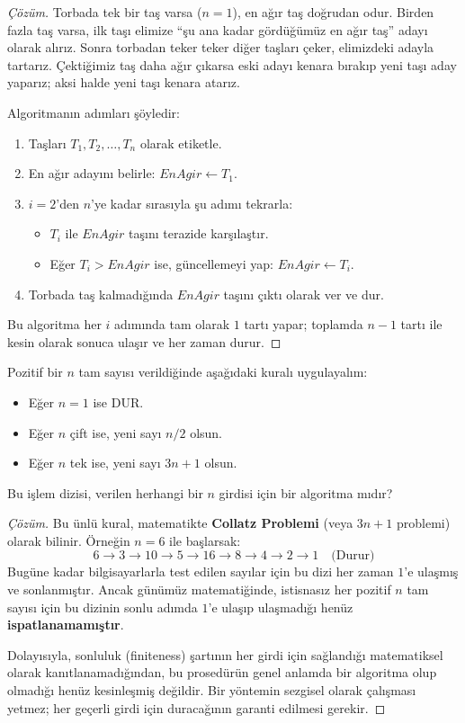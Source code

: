 \begin{proof}[Çözüm]
Torbada tek bir taş varsa ($n=1$), en ağır taş doğrudan odur. Birden fazla taş varsa, ilk taşı elimize ``şu ana kadar gördüğümüz en ağır taş'' adayı olarak alırız. Sonra torbadan teker teker diğer taşları çeker, elimizdeki adayla tartarız. Çektiğimiz taş daha ağır çıkarsa eski adayı kenara bırakıp yeni taşı aday yaparız; aksi halde yeni taşı kenara atarız.

Algoritmanın adımları şöyledir:
\begin{enumerate}
    \item Taşları $T_1, T_2, \dots, T_n$ olarak etiketle.
    \item En ağır adayını belirle: $EnAgir \leftarrow T_1$.
    \item $i = 2$'den $n$'ye kadar sırasıyla şu adımı tekrarla:
    \begin{itemize}
        \item $T_i$ ile $EnAgir$ taşını terazide karşılaştır.
        \item Eğer $T_i > EnAgir$ ise, güncellemeyi yap: $EnAgir \leftarrow T_i$.
    \end{itemize}
    \item Torbada taş kalmadığında $EnAgir$ taşını çıktı olarak ver ve dur.
\end{enumerate}
Bu algoritma her $i$ adımında tam olarak $1$ tartı yapar; toplamda $n - 1$ tartı ile kesin olarak sonuca ulaşır ve her zaman durur.
\end{proof}

\begin{example}
Pozitif bir $n$ tam sayısı verildiğinde aşağıdaki kuralı uygulayalım:
\begin{itemize}
    \item Eğer $n = 1$ ise DUR.
    \item Eğer $n$ çift ise, yeni sayı $n / 2$ olsun.
    \item Eğer $n$ tek ise, yeni sayı $3n + 1$ olsun.
\end{itemize}
Bu işlem dizisi, verilen herhangi bir $n$ girdisi için bir algoritma mıdır?
\end{example}

\begin{proof}[Çözüm]
Bu ünlü kural, matematikte \textbf{Collatz Problemi} (veya $3n+1$ problemi) olarak bilinir. Örneğin $n = 6$ ile başlarsak:
\[ 6 \to 3 \to 10 \to 5 \to 16 \to 8 \to 4 \to 2 \to 1 \quad \text{(Durur)} \]
Bugüne kadar bilgisayarlarla test edilen sayılar için bu dizi her zaman $1$'e ulaşmış ve sonlanmıştır. Ancak günümüz matematiğinde, istisnasız her pozitif $n$ tam sayısı için bu dizinin sonlu adımda $1$'e ulaşıp ulaşmadığı henüz \textbf{ispatlanamamıştır}. 

Dolayısıyla, sonluluk (finiteness) şartının her girdi için sağlandığı matematiksel olarak kanıtlanamadığından, bu prosedürün genel anlamda bir algoritma olup olmadığı henüz kesinleşmiş değildir. Bir yöntemin sezgisel olarak çalışması yetmez; her geçerli girdi için duracağının garanti edilmesi gerekir.
\end{proof}

